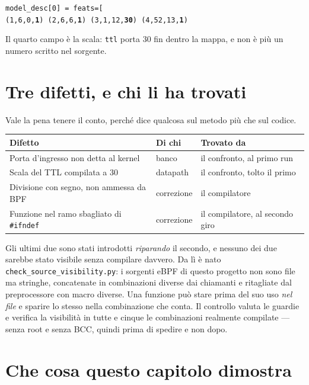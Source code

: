 \documentclass[11pt,a4paper,oneside]{report}
\begin{document}
\begin{center}
\footnotesize
\texttt{model\_desc[0] = feats=[}\\[2pt]
\texttt{(1,6,0,\textbf{1})\ (2,6,6,\textbf{1})\ (3,1,12,\textbf{30})\ (4,52,13,\textbf{1})}
\end{center}

Il quarto campo è la scala: \texttt{ttl} porta 30 fin dentro la mappa, e non è
più un numero scritto nel sorgente.

\section{Tre difetti, e chi li ha trovati}

Vale la pena tenere il conto, perché dice qualcosa sul metodo più che sul
codice.

\begin{center}
\footnotesize
\begin{tabular}{@{}lll@{}}
\toprule
\textbf{Difetto} & \textbf{Di chi} & \textbf{Trovato da} \\
\midrule
Porta d'ingresso non detta al kernel & banco &
  il confronto, al primo run \\
Scala del TTL compilata a 30 & datapath &
  il confronto, tolto il primo \\
Divisione con segno, non ammessa da BPF & correzione &
  il compilatore \\
Funzione nel ramo sbagliato di \texttt{\#ifndef} & correzione &
  il compilatore, al secondo giro \\
\bottomrule
\end{tabular}
\end{center}

Gli ultimi due sono stati introdotti \emph{riparando} il secondo, e nessuno dei
due sarebbe stato visibile senza compilare davvero. Da lì è nato
\texttt{check\_source\_visibility.py}: i sorgenti eBPF di questo progetto non
sono file ma stringhe, concatenate in combinazioni diverse dai chiamanti e
ritagliate dal preprocessore con macro diverse. Una funzione può stare prima
del suo uso \emph{nel file} e sparire lo stesso nella combinazione che conta.
Il controllo valuta le guardie e verifica la visibilità in tutte e cinque le
combinazioni realmente compilate --- senza root e senza BCC, quindi prima di
spedire e non dopo.

\section{Che cosa questo capitolo dimostra}
\end{document}
